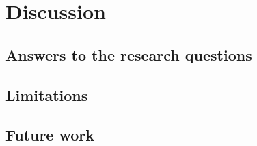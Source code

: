 \chapter{Discussion}
\label{ch:discussion}

\section{Answers to the research questions}

\section{Limitations}

\section{Future work}
